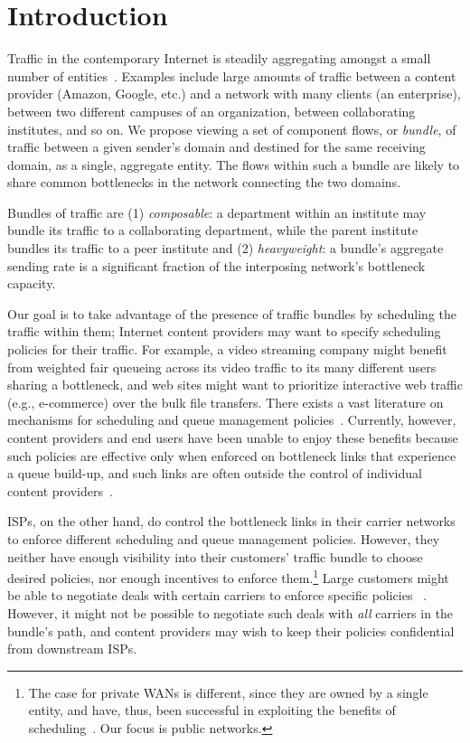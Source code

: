 \section{Introduction}\label{s:intro}

Traffic in the contemporary Internet is steadily aggregating amongst a small number of entities~\cite{fivecomps}. 
Examples include large amounts of traffic between a content provider (\eg Amazon, Google, etc.) and a network with many clients (\eg an enterprise), between two different campuses of an organization, between collaborating institutes, and so on.
We propose viewing a set of component flows, or \emph{bundle}, of traffic between a given sender's domain and destined for the same receiving domain, as a single, aggregate entity.
The flows within such a bundle are likely to share common bottlenecks in the network connecting the two domains.

Bundles of traffic are 
(1) \emph{composable}: \eg a department within an institute may bundle its traffic to a collaborating department, while the parent institute bundles its traffic to a peer institute and
(2) \emph{heavyweight}: a bundle's aggregate sending rate is a significant fraction of the interposing network's bottleneck capacity.

Our goal is to take advantage of the presence of traffic bundles by scheduling the traffic within them;
Internet content providers may want to specify scheduling policies for their traffic. 
For example, a video streaming company might benefit from weighted fair queueing across its video traffic to its many different users sharing a bottleneck, and web sites might want to prioritize interactive web traffic (e.g., e-commerce) over the bulk file transfers. 
There exists a vast literature on mechanisms for scheduling and queue management policies~\cite{diffserv, fair-queueing, sfq, pie, CoDel, fifoplus, virtualClocks, csfq, drr, red, ecn}.
Currently, however, content providers and end users have been unable to enjoy these benefits because such policies are effective only when enforced on bottleneck links that experience a queue build-up, and such links are often outside the control of individual content 
providers~\cite{inferring-interdomain-congestion, isp-throttle-1, isp-throttle-2, isp-throttle-3}. 

ISPs, on the other hand, do control the bottleneck links in their carrier networks to enforce different scheduling and queue management policies. 
However, they neither have enough visibility into their customers' traffic bundle to choose desired policies, nor enough incentives to enforce them.\footnote{The case for private WANs is different, since they are owned by a single entity, and have, thus, been successful in exploiting the benefits of scheduling~\cite{swan, b4, bwe}. Our focus is public networks.} 
Large customers might be able to negotiate deals with certain carriers to enforce specific policies~\cite{att-qos} . 
However, it might not be possible to negotiate such deals with \emph{all} carriers in the bundle's path, and content providers may wish to keep their policies confidential from downstream ISPs.

